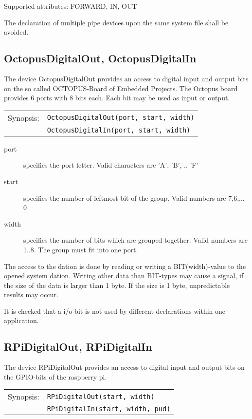 Supported attributes: FORWARD, IN, OUT

The declaration of multiple pipe devices upon the same system file shall
be avoided.
 
\subsection{OctopusDigitalOut, OctopusDigitalIn}
The device OctopusDigitalOut provides an access to digital input and 
output bits
on the so called OCTOPUS-Board of Embedded Projects.
The Octopus board provides 6 ports with 8 bits each. Each bit may be
used as input or output.

\begin{tabular}{ll}
Synopsis:& \verb|OctopusDigitalOut(port, start, width)|\\
        & \verb|OctopusDigitalIn(port, start, width)|\\
\end{tabular}

\begin{description}
\item [port] specifies the port letter. Valid characters are 'A', 'B', .. 'F'
\item[start] specifies the number of leftmost bit of the group. Valid numbers
     are 7,6,... 0
\item [width] specifies the number of bits which are grouped together.
     Valid numbers are 1..8.
     The group must fit into one port.
\end{description}

The access to the dation is done by reading or writing a BIT(width)-value to the
opened system dation. 
Writing other data than BIT-types  may cause a signal, if the size of the
data is larger than 1 byte. If the size is 1 byte, unpredictable results may
occur.

It is checked that a i/o-bit is not used by different declarations within
one application.
  
\subsection{RPiDigitalOut, RPiDigitalIn}
The device RPiDigitalOut provides an access to digital input and output bits
on the GPIO-bits of the raspberry pi.

\begin{tabular}{ll}
Synopsis: & \verb|RPiDigitalOut(start, width)| \\
          & \verb|RPiDigitalIn(start, width, pud)| \\
\end{tabular}

